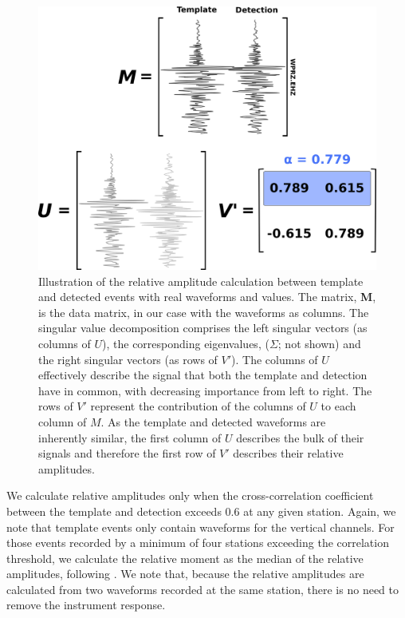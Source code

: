 \begin{figure}[h!]
\begin{center}
\includegraphics[width=0.98\columnwidth]{Chapter_2_Data/figures/mag_calc_example/mag_calc_example_2012sora451121}
\caption[Relative amplitude calculation]{{
Illustration of the relative amplitude calculation between template and detected events with real waveforms and values. The matrix, \textbf{M}, is the data matrix, in our case with the waveforms as columns. The singular value decomposition comprises the left singular vectors (as columns of $U$), the corresponding eigenvalues, ($\Sigma$; not shown) and the right singular vectors (as rows of $V'$). The columns of $U$ effectively describe the signal that both the template and detection have in common, with decreasing importance from left to right. The rows of $V'$ represent the contribution of the columns of $U$ to each column of $M$. As the template and detected waveforms are inherently similar, the first column of $U$ describes the bulk of their signals and therefore the first row of $V'$ describes their relative amplitudes.
{\label{svd_mags}}%
}}
\end{center}
\end{figure}

We calculate relative amplitudes only when the cross-correlation coefficient between the template and detection exceeds 0.6 at any given station. Again, we note that template events only contain waveforms for the vertical channels. For those events recorded by a minimum of four stations exceeding the correlation threshold, we calculate the relative moment as the median of the relative amplitudes, following \citet{Shelly_2016}. We note that, because the relative amplitudes are calculated from two waveforms recorded at the same station, there is no need to remove the instrument response.

